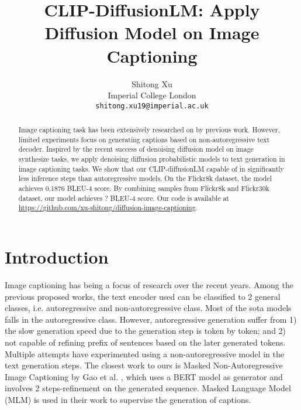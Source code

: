 \documentclass{article}
\title{CLIP-DiffusionLM: Apply Diffusion Model on Image Captioning
}
\author{
  Shitong Xu \\
  Imperial College London \\
  \texttt{shitong.xu19@imperial.ac.uk} \\
}
\begin{document}
\maketitle


\begin{abstract}
Image captioning task has been extensively researched on by previous work. However, limited experiments focus on generating captions based on non-autoregressive text decoder. Inspired by the recent success of denoising diffusion model on image synthesize tasks, we apply denoising diffusion probabilistic models to text generation in image captioning tasks. We show that our CLIP-diffusionLM capable of in significantly less inference steps than autoregressive models. On the Flickr8k dataset, the model achieves 0.1876 BLEU-4 score. By combining samples from Flickr8k and Flickr30k dataset, our model achieves ? BLEU-4 score. Our code is available at \href{https://github.com/xu-shitong/diffusion-image-captioning}{https://github.com/xu-shitong/diffusion-image-captioning}.

\end{abstract}


\section{Introduction}
Image captioning has being a focus of research over the recent years. Among the previous proposed works, the text encoder used can be classified to 2 general classes, i.e. autoregressive and non-autoregressive class. Most of the sota models falls in the autoregressive class\cite{https://doi.org/10.48550/arxiv.1412.6632,DBLP:journals/corr/XuBKCCSZB15,DBLP:journals/corr/LuXPS16,image-caption-with-pos,mplug}. However, autoregressive generation suffer from 1) the slow generation speed due to the generation step is token by token; and 2) not capable of refining prefix of sentences based on the later generated tokens. Multiple attempts have experimented using a non-autoregressive model in the text generation steps\cite{masked-non-autoregres, partial-autoregressive, semi-autoregressive}. The closest work to ours is Masked Non-Autoregressive Image Captioning by Gao et al. \cite{masked-non-autoregres}, which uses a BERT model as generator and involves 2 steps-refinement on the generated sequence. Masked Language Model (MLM) is used in their work to supervise the generation of captions.
\end{document}
